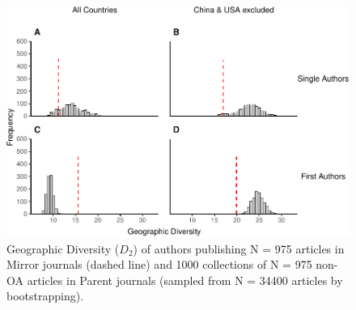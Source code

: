 \documentclass[
  english,
  man]{apa6}
\begin{document}
\begin{figure}

{\centering \includegraphics{Smith_etal_QSS_files/figure-latex/Fig3-1} 

}

\caption{Geographic Diversity ($D_2$) of authors publishing N =  975  articles in Mirror journals (dashed line) and 1000 collections of N =  975  non-OA articles in Parent journals (sampled from N =  34400  articles by bootstrapping).}\label{fig:Fig3}
\end{figure}
\end{document}
